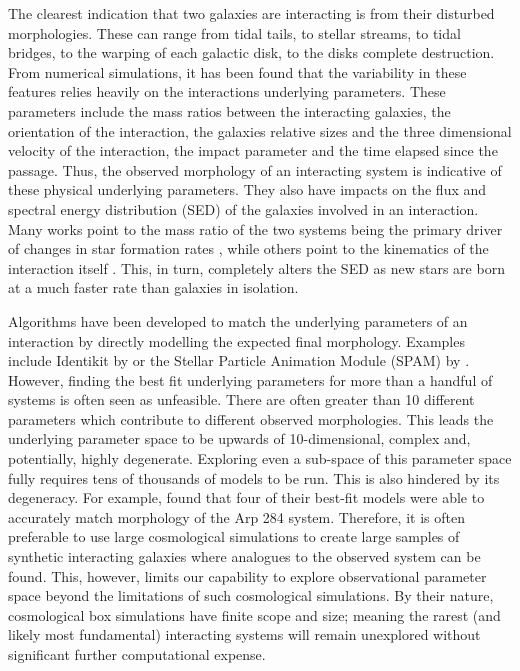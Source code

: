 The clearest indication that two galaxies are interacting is from their disturbed morphologies. These can range from tidal tails, to stellar streams, to tidal bridges, to the warping of each galactic disk, to the disks complete destruction. From numerical simulations, it has been found that the variability in these features relies heavily on the interactions underlying parameters. These parameters include the mass ratios between the interacting galaxies, the orientation of the interaction, the galaxies relative sizes and the three dimensional velocity of the interaction, the impact parameter and the time elapsed since the passage. Thus, the observed morphology of an interacting system is indicative of these physical underlying parameters. They also have impacts on the flux and spectral energy distribution (SED) of the galaxies involved in an interaction. Many works point to the mass ratio of the two systems being the primary driver of changes in star formation rates \citep{2015MNRAS.454.1742K, 2022MNRAS.516.4922R, 2023ApJ...953...91L}, while others point to the kinematics of the interaction itself \citep{2020MNRAS.499.4370M, 2021ApJ...918...55X}. This, in turn, completely alters the SED as new stars are born at a much faster rate than galaxies in isolation.

Algorithms have been developed to match the underlying parameters of an interaction by directly modelling the expected final morphology. Examples include Identikit by \citet{2009AJ....137.3071B} or the Stellar Particle Animation Module (SPAM) by \citet{1990AJ....100.1477W}. However, finding the best fit underlying parameters for more than a handful of systems is often seen as unfeasible. There are often greater than 10 different parameters which contribute to different observed morphologies. This leads the underlying parameter space to be upwards of 10-dimensional, complex and, potentially, highly degenerate. Exploring even a sub-space of this parameter space fully requires tens of thousands of models to be run. This is also hindered by its degeneracy. For example, \citet{2010ASPC..423..227S} found that four of their best-fit models were able to accurately match morphology of the Arp 284 system. Therefore, it is often preferable to use large cosmological simulations \citep[e.g.][]{2015MNRAS.446..521S, 2018MNRAS.480..800H, 2020MNRAS.493.3716H} to create large samples of synthetic interacting galaxies where analogues to the observed system can be found. This, however, limits our capability to explore observational parameter space beyond the limitations of such cosmological simulations. By their nature, cosmological box simulations have finite scope and size; meaning the rarest (and likely most fundamental) interacting systems will remain unexplored without significant further computational expense.

